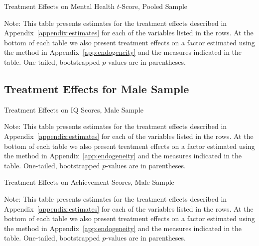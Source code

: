 	\begin{table}[H]
     \caption{Treatment Effects on Mental Health $t$-Score, Pooled Sample}
     \label{table:abccare_rslt_pooled_cat15}
	
	\end{table} 
\begin{spacing}{1}
\begin{footnotesize}
\noindent Note: This table presents estimates for the treatment effects described in Appendix~\ref{appendix:estimates} for each of the variables listed in the rows. At the bottom of each table we also present treatment effects on a factor estimated using the method in Appendix~\ref{app:endogeneity} and the measures indicated in the table. One-tailed, bootstrapped $p$-values are in parentheses.
\end{footnotesize}
\end{spacing}


\subsection{Treatment Effects for Male Sample}


	\begin{table}[H]
     \caption{Treatment Effects on IQ Scores, Male Sample}
     \label{table:abccare_rslt_male_cat0}
	
	\end{table}
\begin{spacing}{1}
\begin{footnotesize}
\noindent Note: This table presents estimates for the treatment effects described in Appendix~\ref{appendix:estimates} for each of the variables listed in the rows. At the bottom of each table we also present treatment effects on a factor estimated using the method in Appendix~\ref{app:endogeneity} and the measures indicated in the table. One-tailed, bootstrapped $p$-values are in parentheses.
\end{footnotesize}
\end{spacing}

	\begin{table}[H]
     \caption{Treatment Effects on Achievement Scores, Male Sample}
     \label{table:abccare_rslt_male_cat1}
	
	\end{table} 
\begin{spacing}{1}
\begin{footnotesize}
\noindent Note: This table presents estimates for the treatment effects described in Appendix~\ref{appendix:estimates} for each of the variables listed in the rows. At the bottom of each table we also present treatment effects on a factor estimated using the method in Appendix~\ref{app:endogeneity} and the measures indicated in the table. One-tailed, bootstrapped $p$-values are in parentheses.
\end{footnotesize}
\end{spacing}

